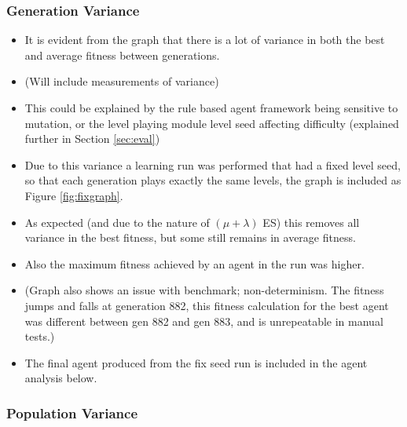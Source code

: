 \clearpage

\subsubsection{Generation Variance}


\begin{itemize}
\item It is evident from the graph that there is a lot of variance in both the best and average fitness between generations.
\item (Will include measurements of variance)
\item This could be explained by the rule based agent framework being sensitive to mutation, or the level playing module level seed affecting difficulty (explained further in Section \ref{sec:eval})
\item Due to this variance a learning run was performed that had a fixed level seed, so that each generation plays exactly the same levels, the graph is included as Figure \ref{fig:fixgraph}.
\item As expected (and due to the nature of $(\mu  + \lambda)$ ES) this removes all variance in the best fitness, but some still remains in average fitness.
\item Also the maximum fitness achieved by an agent in the run was higher.
\item (Graph also shows an issue with benchmark; non-determinism. The fitness jumps and falls at generation 882, this fitness calculation for the best agent was different between gen 882 and gen 883, and is unrepeatable in manual tests.)
\item The final agent produced from the fix seed run is included in the agent analysis below.
\end{itemize}

\subsubsection{Population Variance}

